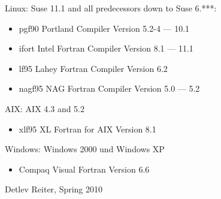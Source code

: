 Linux: Suse 11.1 and all predecessors down to Suse 6.***:
\begin{itemize}
  \item pgf90 Portland Compiler Version 5.2-4  --- 10.1
  \item ifort Intel Fortran Compiler
        Version 8.1 --- 11.1
  \item lf95 Lahey Fortran Compiler Version 6.2
  \item nagf95	NAG Fortran Compiler Version 5.0 --- 5.2
\end{itemize}
AIX: AIX 4.3 and 5.2
\begin{itemize}
  \item xlf95	XL Fortran for AIX Version 8.1
\end{itemize}
Windows: Windows 2000 und Windows XP
\begin{itemize}
  \item Compaq Visual Fortran Version 6.6
\end{itemize}

Detlev Reiter, Spring	      2010
